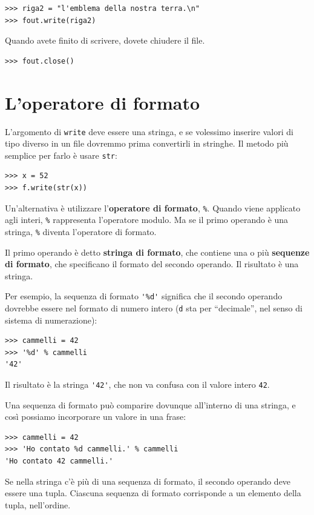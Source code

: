 \documentclass[10pt]{book}
\begin{document}
\begin{verbatim}
>>> riga2 = "l'emblema della nostra terra.\n"
>>> fout.write(riga2)
\end{verbatim}
%
Quando avete finito di scrivere, dovete chiudere il file.

\begin{verbatim}
>>> fout.close()
\end{verbatim}
%


\section{L'operatore di formato}

L'argomento di {\tt write} deve essere una stringa, e se volessimo inserire valori di tipo diverso in un file dovremmo prima convertirli in stringhe. Il metodo più semplice per farlo è usare {\tt str}:

\begin{verbatim}
>>> x = 52
>>> f.write(str(x))
\end{verbatim}
%
Un'alternativa è utilizzare l'{\bf operatore di formato}, {\tt \%}.  Quando viene applicato agli interi, {\tt \%} rappresenta l'operatore modulo.  Ma se il primo operando è una stringa, {\tt \%} diventa l'operatore di formato.

Il primo operando è detto {\bf stringa di formato}, che contiene una o più {\bf sequenze di formato}, che specificano il formato del secondo operando. Il risultato è una stringa.

Per esempio, la sequenza di formato \verb"'%d'" significa che il secondo operando dovrebbe essere nel formato di numero intero ({\tt d} sta per ``decimale'', nel senso di sistema di numerazione):

\begin{verbatim}
>>> cammelli = 42
>>> '%d' % cammelli
'42'
\end{verbatim}
%
Il risultato è la stringa \verb"'42'", che non va confusa con il valore intero {\tt 42}.

Una sequenza di formato può comparire dovunque all'interno di una
   stringa, e così possiamo incorporare un valore in una frase:

\begin{verbatim}
>>> cammelli = 42
>>> 'Ho contato %d cammelli.' % cammelli
'Ho contato 42 cammelli.'
\end{verbatim}
%
Se nella stringa c'è più di una sequenza di formato, il secondo operando deve essere una tupla. Ciascuna sequenza di formato corrisponde a un elemento della tupla, nell'ordine.
\end{document}
